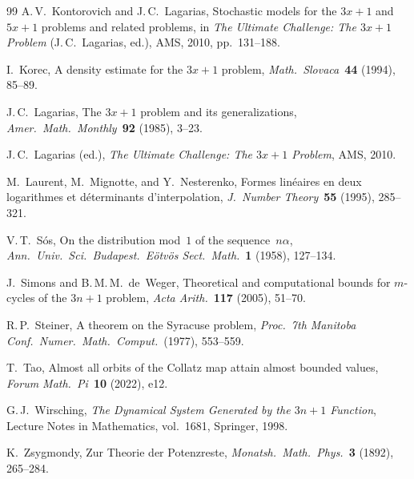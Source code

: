 \documentclass[12pt, a4paper]{amsart}
\theoremstyle{plain}
\theoremstyle{definition}
\theoremstyle{remark}
\begin{document}
\begin{thebibliography}{99}
  A.\,V.~Kontorovich and J.\,C.~Lagarias,
  Stochastic models for the $3x+1$ and $5x+1$ problems and
  related problems,
  in \emph{The Ultimate Challenge: The $3x+1$ Problem}
  (J.\,C.~Lagarias, ed.),
  AMS, 2010, pp.~131--188.

  I.~Korec,
  A density estimate for the $3x+1$ problem,
  \emph{Math.\ Slovaca}\ \textbf{44} (1994), 85--89.

  J.\,C.~Lagarias,
  The $3x+1$ problem and its generalizations,
  \emph{Amer.\ Math.\ Monthly}\ \textbf{92} (1985), 3--23.

  J.\,C.~Lagarias (ed.),
  \emph{The Ultimate Challenge: The $3x+1$ Problem},
  AMS, 2010.

  M.~Laurent, M.~Mignotte, and Y.~Nesterenko,
  Formes lin\'eaires en deux logarithmes et d\'eterminants
  d'interpolation,
  \emph{J.\ Number Theory}\ \textbf{55} (1995), 285--321.

  V.\,T.~S\'os,
  On the distribution mod~$1$ of the sequence~$n\alpha$,
  \emph{Ann.\ Univ.\ Sci.\ Budapest.\ E\"otv\"os Sect.\
  Math.}\ \textbf{1} (1958), 127--134.

  J.~Simons and B.\,M.\,M.~de~Weger,
  Theoretical and computational bounds for $m$-cycles of
  the $3n+1$ problem,
  \emph{Acta Arith.}\ \textbf{117} (2005), 51--70.

  R.\,P.~Steiner,
  A theorem on the Syracuse problem,
  \emph{Proc.\ 7th Manitoba Conf.\ Numer.\ Math.\ Comput.}\
  (1977), 553--559.

  T.~Tao,
  Almost all orbits of the Collatz map attain almost
  bounded values,
  \emph{Forum Math.\ Pi}\ \textbf{10} (2022), e12.

  G.\,J.~Wirsching,
  \emph{The Dynamical System Generated by the $3n+1$
  Function},
  Lecture Notes in Mathematics, vol.~1681,
  Springer, 1998.

  K.~Zsygmondy,
  Zur Theorie der Potenzreste,
  \emph{Monatsh.\ Math.\ Phys.}\ \textbf{3} (1892), 265--284.

\end{thebibliography}
\end{document}
